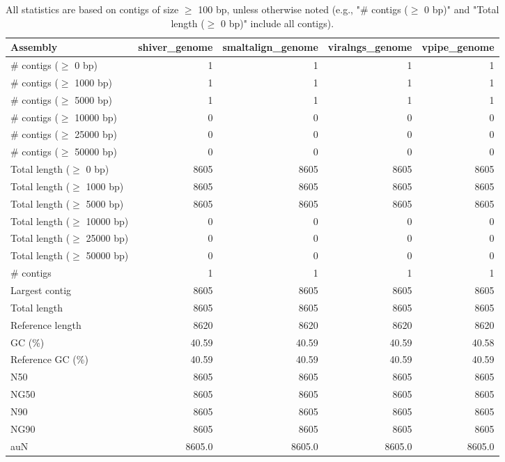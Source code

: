 \documentclass[12pt,a4paper]{article}
\begin{document}
\begin{table}[ht]
\begin{center}
\caption{All statistics are based on contigs of size $\geq$ 100 bp, unless otherwise noted (e.g., "\# contigs ($\geq$ 0 bp)" and "Total length ($\geq$ 0 bp)" include all contigs).}
\begin{tabular}{|l*{4}{|r}|}
\hline
Assembly & shiver\_genome & smaltalign\_genome & viralngs\_genome & vpipe\_genome \\ \hline
\# contigs ($\geq$ 0 bp) & 1 & 1 & 1 & 1 \\ \hline
\# contigs ($\geq$ 1000 bp) & 1 & 1 & 1 & 1 \\ \hline
\# contigs ($\geq$ 5000 bp) & 1 & 1 & 1 & 1 \\ \hline
\# contigs ($\geq$ 10000 bp) & 0 & 0 & 0 & 0 \\ \hline
\# contigs ($\geq$ 25000 bp) & 0 & 0 & 0 & 0 \\ \hline
\# contigs ($\geq$ 50000 bp) & 0 & 0 & 0 & 0 \\ \hline
Total length ($\geq$ 0 bp) & 8605 & 8605 & 8605 & 8605 \\ \hline
Total length ($\geq$ 1000 bp) & 8605 & 8605 & 8605 & 8605 \\ \hline
Total length ($\geq$ 5000 bp) & 8605 & 8605 & 8605 & 8605 \\ \hline
Total length ($\geq$ 10000 bp) & 0 & 0 & 0 & 0 \\ \hline
Total length ($\geq$ 25000 bp) & 0 & 0 & 0 & 0 \\ \hline
Total length ($\geq$ 50000 bp) & 0 & 0 & 0 & 0 \\ \hline
\# contigs & 1 & 1 & 1 & 1 \\ \hline
Largest contig & 8605 & 8605 & 8605 & 8605 \\ \hline
Total length & 8605 & 8605 & 8605 & 8605 \\ \hline
Reference length & 8620 & 8620 & 8620 & 8620 \\ \hline
GC (\%) & 40.59 & 40.59 & 40.59 & 40.58 \\ \hline
Reference GC (\%) & 40.59 & 40.59 & 40.59 & 40.59 \\ \hline
N50 & 8605 & 8605 & 8605 & 8605 \\ \hline
NG50 & 8605 & 8605 & 8605 & 8605 \\ \hline
N90 & 8605 & 8605 & 8605 & 8605 \\ \hline
NG90 & 8605 & 8605 & 8605 & 8605 \\ \hline
auN & 8605.0 & 8605.0 & 8605.0 & 8605.0 \\ \hline

\end{tabular}
\end{center}
\end{table}
\end{document}
